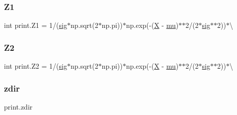 \subsubsection{\texorpdfstring{Z1}{Z1}}
{\footnotesize\ttfamily int print.\+Z1 = 1/(\mbox{\hyperlink{namespaceprint_a1efc77cd3bf0d758b07ec8e2b2c71c6b}{sig}}$\ast$np.\+sqrt(2$\ast$np.\+pi))$\ast$np.\+exp(-\/(\mbox{\hyperlink{namespaceprint_affd04964e07d6931f5b7f92164b9b99f}{X}} -\/ \mbox{\hyperlink{namespaceprint_a0d1f4b3564b3a18949e4a9d42c0fe83b}{mu}})$\ast$$\ast$2/(2$\ast$\mbox{\hyperlink{namespaceprint_a1efc77cd3bf0d758b07ec8e2b2c71c6b}{sig}}$\ast$$\ast$2))$\ast$\textbackslash{}}

\mbox{\label{namespaceprint_a09064592a1be5db47dee477a81ae8bf3}} 
\subsubsection{\texorpdfstring{Z2}{Z2}}
{\footnotesize\ttfamily int print.\+Z2 = 1/(\mbox{\hyperlink{namespaceprint_a1efc77cd3bf0d758b07ec8e2b2c71c6b}{sig}}$\ast$np.\+sqrt(2$\ast$np.\+pi))$\ast$np.\+exp(-\/(\mbox{\hyperlink{namespaceprint_affd04964e07d6931f5b7f92164b9b99f}{X}} -\/ \mbox{\hyperlink{namespaceprint_a0d1f4b3564b3a18949e4a9d42c0fe83b}{mu}})$\ast$$\ast$2/(2$\ast$\mbox{\hyperlink{namespaceprint_a1efc77cd3bf0d758b07ec8e2b2c71c6b}{sig}}$\ast$$\ast$2))$\ast$\textbackslash{}}

\mbox{\label{namespaceprint_a25485f663d582df21114be2f03bad0e0}} 
\subsubsection{\texorpdfstring{zdir}{zdir}}
{\footnotesize\ttfamily print.\+zdir}

